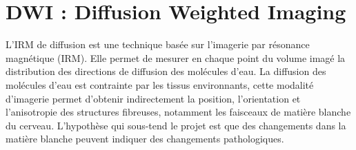 \section{DWI : Diffusion Weighted Imaging}

L'IRM de diffusion est une technique basée sur l'imagerie par résonance magnétique (IRM).
Elle permet de mesurer en chaque point du volume imagé la distribution des directions de diffusion des molécules d'eau.
La diffusion des molécules d'eau est contrainte par les tissus environnants, cette modalité d'imagerie permet d'obtenir indirectement la position, l'orientation et l'anisotropie des structures fibreuses, notamment les faisceaux de matière blanche du cerveau.
L'hypothèse qui sous-tend le projet est que des changements dans la matière blanche peuvent indiquer des changements pathologiques.
